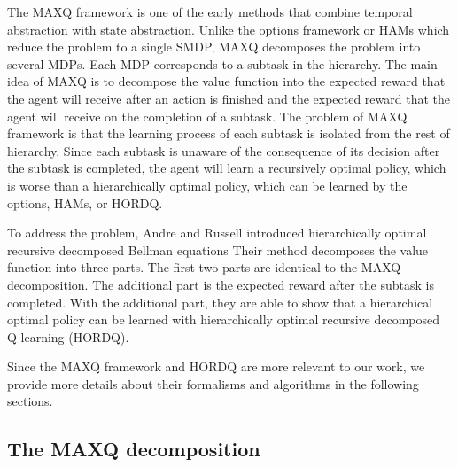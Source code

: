 The MAXQ framework is one of the early methods that combine temporal abstraction with state abstraction.
Unlike the options framework or HAMs which reduce the problem to a single SMDP, MAXQ decomposes
the problem into several MDPs. Each MDP corresponds to a subtask in the hierarchy.
The main idea of MAXQ is to decompose the value function into the expected reward that
the agent will receive after an action is finished and the expected reward that
the agent will receive on the completion of a subtask. 
The problem of MAXQ framework is that the learning process of each subtask 
is isolated from the rest of hierarchy. Since each subtask is unaware
of the consequence of its decision after the subtask is completed, 
the agent will learn a recursively optimal policy, which is worse than
a hierarchically optimal policy, which can be learned by the options, HAMs, or HORDQ.

To address the problem,
Andre and Russell \cite{Andre02, HORDQ} introduced hierarchically optimal recursive decomposed Bellman equations
Their method decomposes the value function into three parts. The first two parts are identical to the MAXQ decomposition.
The additional part is the expected reward after the subtask is completed.
With the additional part, they are able to show that a hierarchical optimal policy can be learned with hierarchically
optimal recursive decomposed Q-learning (HORDQ).

Since the MAXQ framework and HORDQ are more relevant to our work,
we provide more details about their formalisms and algorithms in the following sections.

\subsection{The MAXQ decomposition}


